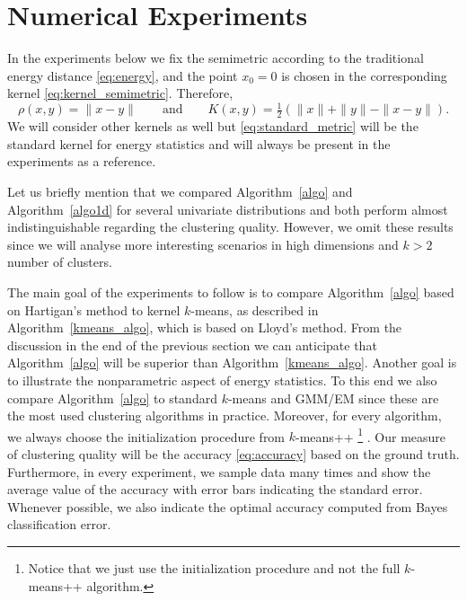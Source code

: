 \documentclass[aps,preprint,nofootinbib,floatfix]{revtex4-1}
\newcommand\kk{K}
\begin{document}
\section{Numerical Experiments}
\label{sec:numerics}

In the experiments below we fix the semimetric 
according to the traditional energy distance \eqref{eq:energy}, and
the point $x_0=0$ is chosen in the corresponding kernel  
\eqref{eq:kernel_semimetric}. Therefore,
\begin{equation}
\label{eq:standard_metric}
\rho(x,y) = \| x-y\| \qquad \mbox{and} \qquad \kk(x,y) = 
\tfrac{1}{2}\left( \| x \| + \| y \| - \| x-y \| \right).
\end{equation}
We will consider other kernels as well 
but \eqref{eq:standard_metric} will be the
standard kernel for energy statistics and will always be present in the
experiments as a reference.

Let us briefly mention that we compared Algorithm~\ref{algo} and
Algorithm~\ref{algo1d} for several univariate distributions and
both perform almost indistinguishable regarding the clustering quality.
However, we omit these results since we will analyse more interesting 
scenarios in high dimensions and $k > 2$ number of clusters.

The main goal of the 
experiments  to follow
is to compare Algorithm~\ref{algo} based on Hartigan's method to
kernel $k$-means, as described in Algorithm~\ref{kmeans_algo}, which
is based on Lloyd's method. 
From the discussion in the end of the previous section we can anticipate
that Algorithm~\ref{algo} will be superior than Algorithm~\ref{kmeans_algo}.
Another goal is to illustrate the nonparametric aspect of energy statistics.
To this end we also compare
Algorithm~\ref{algo} to standard $k$-means and GMM/EM since 
these are the most used
clustering algorithms in practice.
Moreover, for every algorithm, we always
choose the initialization procedure from $k$-means++%
\footnote{Notice that we just use the initialization
procedure and not the full $k$-means++ algorithm.} \cite{Vassilvitskii}.
Our measure of clustering quality will be the accuracy \eqref{eq:accuracy}
based on the ground truth. Furthermore, in every experiment, we sample
data many times and show the average value of the accuracy with error bars
indicating the standard error. Whenever possible, 
we also indicate the optimal 
accuracy computed from
Bayes classification error.
\end{document}
